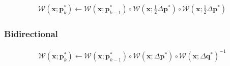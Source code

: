 \begin{equation}
 	\begin{aligned}
    	\mathcal{W}(\mathbf{x}; \mathbf{p}_k^*) \leftarrow \mathcal{W}(\mathbf{x}; \mathbf{p}_{k-1}^*) \circ \mathcal{W}(\mathbf{x}; \frac{1}{2} \Delta \mathbf{p}^*)\circ \mathcal{W}(\mathbf{x}; \frac{1}{2} \Delta \mathbf{p}^*) 
    \label{eq:ac_update}
    \end{aligned}
\end{equation}

\subsubsection{Bidirectional}
\label{sec:bidirectional}

\begin{equation}
 	\begin{aligned}
    	\mathcal{W}(\mathbf{x}; \mathbf{p}_k^*) \leftarrow \mathcal{W}(\mathbf{x}; \mathbf{p}_{k-1}^*) \circ \mathcal{W}(\mathbf{x}; \Delta \mathbf{p}^*)\circ \mathcal{W}(\mathbf{x}; \Delta \mathbf{q}^*)^{-1} 
    \label{eq:bc_update}
    \end{aligned}
\end{equation}
